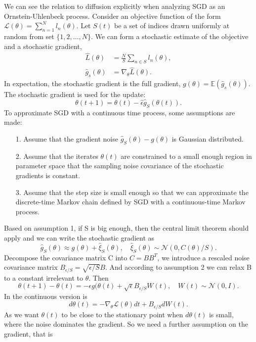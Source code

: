 \documentclass[11pt]{article}
\begin{document}
We can see the relation to diffusion explicitly when analyzing SGD as an Ornstein-Uhlenbeck process. Consider an objective function of the form $\mathcal L(\theta) = \sum_{n=1}^N l_n(\theta)$. Let $S(t)$ be a set of indices drawn uniformly at random from set $\{1,2,\dots,N\}$. We can form a stochastic estimate of the objective and a stochastic gradient,
\begin{align}
\hat L(\theta) &= \frac{N}{S} \sum_{n\in S} l_n(\theta),\\
\hat g_s(\theta) &= \nabla_\theta  \hat L(\theta).
\end{align}
In expectation, the stochastic gradient is the full gradient, $g(\theta) = \mathbb E(\hat{g}_s(\theta) )$. The stochastic gradient is used for the update:
\begin{equation}
\theta(t+1) = \theta(t) - \hat\epsilon \hat g_S(\theta(t)).
\end{equation}
To approximate SGD with a continuous time process, some assumptions are made:
\begin{itemize}
\item[1.] Assume that the gradient noise $\hat g_S(\theta)-g(\theta) $ is Gaussian distributed.
\item[2.] Assume that the iterates $\theta(t)$ are constrained to a small enough region in parameter space that the sampling noise covariance of the stochastic gradients is constant.
\item[3.] Assume that the step size is small enough so that we can approximate the discrete-time Markov chain defined by SGD with a continuous-time Markov process.
\end{itemize}

Based on assumption 1, if S is big enough, then the central limit theorem should apply and we can write the stochastic gradient as
\begin{equation}
\hat g_S(\theta) \approx g(\theta) + \hat \xi_S(\theta), \quad \hat \xi_S(\theta)\sim \mathcal N(0,C(\theta)/S).
\end{equation}
Decompose the covariance matrix C into $C = BB^T$, we introduce a rescaled noise covariance matrix $B_{\epsilon/S} = \sqrt{\epsilon/S}B$. And according to assumption 2 we can relax B to a constant irrelevant to $\theta$.
Then 
\begin{equation}
\theta(t+1) - \theta(t) = -\epsilon g(\theta(t) + \sqrt{\epsilon} B_{\epsilon/S}W(t), \quad W(t)\sim \mathcal N(0,I).
\end{equation}
In the continuous version is 
\begin{equation}
d\theta(t) = -\nabla_\theta \mathcal L (\theta)dt + B_{\epsilon/S} dW(t).
\end{equation}
As we want $\theta(t)$ to be close to the stationary point when $d\theta(t)$ is small, where the noise dominates the gradient. So we need a further assumption on the gradient, that is 
\end{document}
